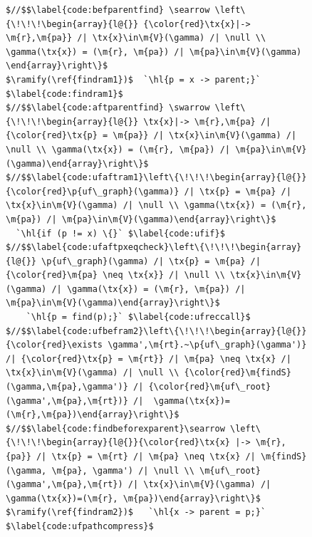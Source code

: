 \documentclass[acmsmall,screen]{acmart}  %
\newcommand{\tx}[1]{\text{#1}}
\newcommand{\p}[1]{\ensuremath{\mathsf{#1}}} \newcommand{\m}[1]{\ensuremath{\mathit{#1}}} \newcommand{\ma}[1]{\ensuremath{\mathcal{#1}}} \let\ramify\lightning
\newcommand{\hl}[1]{\colorbox{lightgray}{#1}} %
\begin{document}
\begin{figure}[t]
\begin{lstlisting}[multicols=2]
$//$$\label{code:befparentfind} \searrow \left\{\!\!\!\begin{array}{l@{}} {\color{red}\tx{x}|-> \m{r},\m{pa}} /| \tx{x}\in\m{V}(\gamma) /| \null \\ \gamma(\tx{x}) = (\m{r}, \m{pa}) /| \m{pa}\in\m{V}(\gamma) \end{array}\right\}$
$\ramify(\ref{findram1})$  `\hl{p = x -> parent;}` $\label{code:findram1}$
$//$$\label{code:aftparentfind} \swarrow \left\{\!\!\!\begin{array}{l@{}} \tx{x}|-> \m{r},\m{pa} /| {\color{red}\tx{p} = \m{pa}} /| \tx{x}\in\m{V}(\gamma) /| \null \\ \gamma(\tx{x}) = (\m{r}, \m{pa}) /| \m{pa}\in\m{V}(\gamma)\end{array}\right\}$
$//$$\label{code:ufaftram1}\left\{\!\!\!\begin{array}{l@{}} {\color{red}\p{uf\_graph}(\gamma)} /| \tx{p} = \m{pa} /| \tx{x}\in\m{V}(\gamma) /| \null \\ \gamma(\tx{x}) = (\m{r}, \m{pa}) /| \m{pa}\in\m{V}(\gamma)\end{array}\right\}$
  `\hl{if (p != x) \{}` $\label{code:ufif}$
$//$$\label{code:ufaftpxeqcheck}\left\{\!\!\!\begin{array}{l@{}} \p{uf\_graph}(\gamma) /| \tx{p} = \m{pa} /| {\color{red}\m{pa} \neq \tx{x}} /| \null \\ \tx{x}\in\m{V}(\gamma) /| \gamma(\tx{x}) = (\m{r}, \m{pa}) /| \m{pa}\in\m{V}(\gamma)\end{array}\right\}$
    `\hl{p = find(p);}` $\label{code:ufreccall}$
$//$$\label{code:ufbefram2}\left\{\!\!\!\begin{array}{l@{}}{\color{red}\exists \gamma',\m{rt}.~\p{uf\_graph}(\gamma')} /| {\color{red}\tx{p} = \m{rt}} /| \m{pa} \neq \tx{x} /| \tx{x}\in\m{V}(\gamma) /| \null \\ {\color{red}\m{findS}(\gamma,\m{pa},\gamma')} /| {\color{red}\m{uf\_root}(\gamma',\m{pa},\m{rt})} /|  \gamma(\tx{x})=(\m{r},\m{pa})\end{array}\right\}$
$//$$\label{code:findbeforexparent}\searrow \left\{\!\!\!\begin{array}{l@{}}{\color{red}\tx{x} |-> \m{r},{pa}} /| \tx{p} = \m{rt} /| \m{pa} \neq \tx{x} /| \m{findS}(\gamma, \m{pa}, \gamma') /| \null \\ \m{uf\_root}(\gamma',\m{pa},\m{rt}) /| \tx{x}\in\m{V}(\gamma) /| \gamma(\tx{x})=(\m{r}, \m{pa})\end{array}\right\}$
$\ramify(\ref{findram2})$   `\hl{x -> parent = p;}` $\label{code:ufpathcompress}$

\end{lstlisting}
\end{figure}
\end{document}
